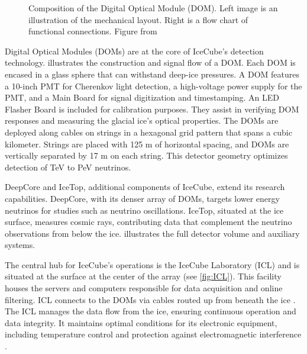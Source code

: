 \begin{figure}
    \caption{Composition of the Digital Optical Module (DOM). Left image is an illustration of the mechanical layout. Right is a flow chart of functional connections. Figure from \cite{IC3_thedetector}}
    \label{fig:DOM}
\end{figure}

Digital Optical Modules (DOMs) are at the core of IceCube’s detection technology.
 illustrates the construction and signal flow of a DOM.
Each DOM is encased in a glass sphere that can withstand deep-ice pressures.
A DOM features a 10-inch PMT for Cherenkov light detection, a high-voltage power supply for the PMT, and a Main Board for signal digitization and timestamping.
An LED Flasher Board is included for calibration purposes.
They assist in verifying DOM responses and measuring the glacial ice's optical properties.
The DOMs are deployed along cables on strings in a hexagonal grid pattern that spans a cubic kilometer.
Strings are placed with 125 m of horizontal spacing, and DOMs are vertically separated by 17 m on each string.
This detector geometry optimizes detection of TeV to PeV neutrinos.

DeepCore and IceTop, additional components of IceCube, extend its research capabilities.
DeepCore, with its denser array of DOMs, targets lower energy neutrinos for studies such as neutrino oscillations.
IceTop, situated at the ice surface, measures cosmic rays, contributing data that complement the neutrino observations from below the ice.
 illustrates the full detector volume and auxiliary systems.

The central hub for IceCube's operations is the IceCube Laboratory (ICL) and is situated at the surface at the center of the array (see \cref{fig:ICL}).
This facility houses the servers and computers responsible for data acquisition and online filtering.
ICL connects to the DOMs via cables routed up from beneath the ice \cite{IC3_thedetector}.
The ICL manages the data flow from the ice, ensuring continuous operation and data integrity.
It maintains optimal conditions for its electronic equipment, including temperature control and protection against electromagnetic interference \cite{IC3_thedetector}.


